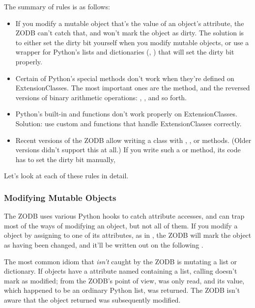 The summary of rules is as follows:

\begin{itemize}
\item If you modify a mutable object that's the value of an object's
attribute, the ZODB can't catch that, and won't mark the object as
dirty.  
The solution is to either set the dirty bit yourself when you modify
mutable objects, or use a wrapper for Python's lists and dictionaries
(, 
)
that will set the dirty bit properly.

\item Certain of Python's special methods don't work when they're
defined on ExtensionClasses.  The most important ones are the
 method, and the reversed versions of binary
arithmetic operations: , , and so
forth.

\item Python's built-in  and 
functions don't work properly on ExtensionClasses.  Solution: use
custom  and  functions
that handle ExtensionClasses correctly.

\item Recent versions of the ZODB allow writing a class with 
 , , or  methods.  (Older versions didn't support this at all.)
If you write such a  or  method, 
its code has to set the dirty bit manually, 

\end{itemize}

Let's look at each of these rules in detail.

\subsubsection{Modifying Mutable Objects}

The ZODB uses various Python hooks to catch attribute accesses, and
can trap most of the ways of modifying an object, but not all of them.
If you modify a  object by assigning to one of its
attributes, as in , the ZODB will
mark the object as having been changed, and it'll be written out on
the following .

The most common idiom that \emph{isn't} caught by the ZODB is
mutating a list or dictionary.  If  objects have a
attribute named  containing a list, calling
 doesn't mark
 as modified; from the ZODB's point of
view,  was only read, and its value, which
happened to be an ordinary Python list, was returned.  The ZODB isn't
aware that the object returned was subsequently modified.

